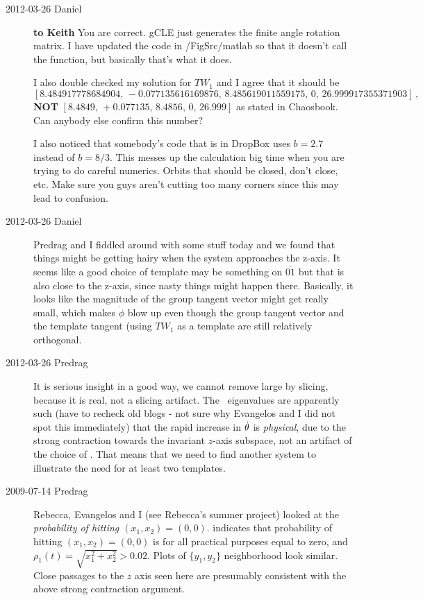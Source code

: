 \begin{description}
\item[2012-03-26 Daniel] {\bf to Keith}  You are correct. gCLE just
generates the finite angle rotation matrix. I have updated the code in
/FigSrc/matlab so that it doesn't call the function, but basically that's
what it does.

I also double checked my solution for $TW_1$ and I agree that it should be
\[
[8.484917778684904, \,-0.077135616169876,\,8.485619011559175,\,0,\,26.999917355371903]
\,,
\]
{\bf NOT} $[8.4849,\,+0.077135,\,8.4856,\,0,\,26.999]$ as stated in
 Chaosbook. Can anybody else confirm this number?                       \toCB

I also noticed that somebody's code that is in DropBox uses $b = 2.7$
instead of $b = 8/3$. This messes up the calculation big time when you
are trying to do careful numerics. Orbits that should be closed, don't
close, etc. Make sure you guys aren't cutting too many corners since this
may lead to confusion.

\item[2012-03-26 Daniel]
Predrag and I fiddled around with some stuff today and we found that
things might be getting hairy when the system approaches the z-axis. It
seems like a good choice of template may be something on $\overline{01}$
but that is also close to the z-axis, since nasty things might happen
there. Basically, it looks like the magnitude of the group tangent vector
might get really small, which makes $\dot{\phi}$ blow up even though the
group tangent vector and the template tangent (using $TW_1$ as a template
are still relatively orthogonal.

\item[2012-03-26 Predrag] It is serious insight in a good way, we cannot remove
large {\phaseVel} by slicing, because it is real, not a slicing artifact.
The \eqv\ eigenvalues are apparently such (have to recheck old blogs -
not sure why Evangelos and I did not spot this immediately) that the
rapid increase in {\phaseVel} $\dot{\theta}$ is \emph{physical}, due to
the strong contraction towards the invariant $z$-axis subspace, not an
artifact of the choice of \slice. That means that we need to find another
system to illustrate the need for at least two templates.

\item[2009-07-14 Predrag] Rebecca, Evangelos and I (see
 {Rebecca's summer project})
looked at the {\em probability of hitting $(x_1,x_2) =(0,0)$}.
 indicates that probability of hitting
$(x_1,x_2) =(0,0)$ is for all practical purposes equal to zero, and
$\rho_1(t)=\sqrt{x_1^2+x_2^2} > 0.02$. Plots of $\{y_1,y_2\}$
neighborhood look similar. Close passages to the $z$ axis seen here
are presumably consistent with the above strong contraction argument.


\end{description}
